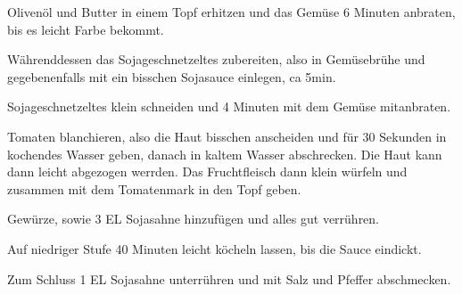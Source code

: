 \begin{recipe}
{    \step%
    Olivenöl und Butter in einem Topf erhitzen und das Gemüse 6 Minuten anbraten, bis es leicht Farbe bekommt.
    
    \step%
    Währenddessen das Sojageschnetzeltes zubereiten, also in Gemüsebrühe und gegebenenfalls mit ein bisschen Sojasauce einlegen, ca 5min.

    \step%
    Sojageschnetzeltes klein schneiden und 4 Minuten mit dem Gemüse mitanbraten.

    \step%
    Tomaten blanchieren, also die Haut bisschen anscheiden und für 30 Sekunden in kochendes Wasser geben, danach in kaltem Wasser abschrecken. Die Haut kann dann leicht abgezogen werrden. Das Fruchtfleisch dann klein würfeln und zusammen mit dem Tomatenmark in den Topf geben.
    
    \step%
    Gewürze, sowie 3 EL Sojasahne hinzufügen und alles gut verrühren.
    
    \step%
    Auf niedriger Stufe 40 Minuten leicht köcheln lassen, bis die Sauce eindickt.
    
    \step%
    Zum Schluss 1 EL Sojasahne unterrühren und mit Salz und Pfeffer abschmecken.
}





\end{recipe}
